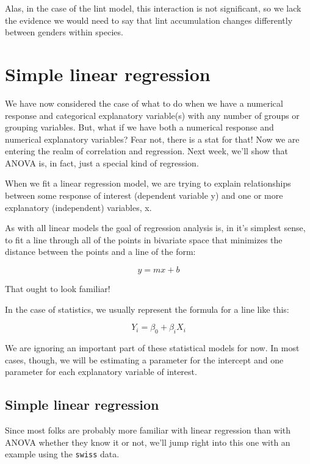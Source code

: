 \documentclass[
]{book}
\begin{document}
Alas, in the case of the lint model, this interaction is not significant, so we lack the evidence we would need to say that lint accumulation changes differently between genders within species.

\hypertarget{simple-linear-regression}{%
\section{Simple linear regression}\label{simple-linear-regression}}

We have now considered the case of what to do when we have a numerical response and categorical explanatory variable(s) with any number of groups or grouping variables. But, what if we have both a numerical response and numerical explanatory variables? Fear not, there is a stat for that! Now we are entering the realm of correlation and regression. Next week, we'll show that ANOVA is, in fact, just a special kind of regression.

When we fit a linear regression model, we are trying to explain relationships between some response of interest (dependent variable y) and one or more explanatory (independent) variables, x.

As with all linear models the goal of regression analysis is, in it's simplest sense, to fit a line through all of the points in bivariate space that minimizes the distance between the points and a line of the form:

\[y = mx + b\]

That ought to look familiar!

In the case of statistics, we usually represent the formula for a line like this:

\[Y_i = \beta_0 + \beta_i X_i\]

We are ignoring an important part of these statistical models for now. In most cases, though, we will be estimating a parameter for the intercept and one parameter for each explanatory variable of interest.

\hypertarget{simple-linear-regression-1}{%
\subsection{Simple linear regression}\label{simple-linear-regression-1}}

Since most folks are probably more familiar with linear regression than with ANOVA whether they know it or not, we'll jump right into this one with an example using the \texttt{swiss} data.
\end{document}
